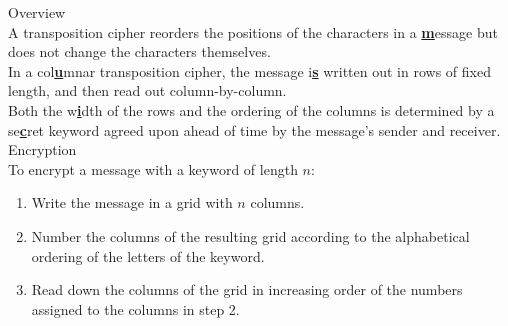 \begin{minipage}{6cm}\raggedright
\textsf{\LARGE Overview}\\[1.0ex]

A transposition cipher reorders the positions of the characters in a \underline{\textbf{m}}essage but does not change the characters themselves.\\[1.25ex]

In a col\underline{\textbf{u}}mnar transposition cipher, the message i\underline{\textbf{s}} written out in rows of fixed length, and then read out column-by-column.\\[1.25ex]

Both the w\underline{\textbf{i}}dth of the rows and the ordering of the columns is determined by a se\underline{\textbf{c}}ret keyword agreed upon ahead of time by the message's sender and receiver.\\[3.0ex]

\textsf{\LARGE Encryption}\\[1.0ex]

To encrypt a message with a keyword of length $n$:
\begin{enumerate}[leftmargin=*]
	\item Write the message in a grid with $n$ columns.\\[1.25ex]
	\item Number the columns of the resulting  grid according to the alphabetical ordering of the letters of the keyword.
	\item Read down the columns of the grid in increasing order of the numbers assigned to the columns in step 2.
\end{enumerate}
%
%
%
%
%
%
\end{minipage}